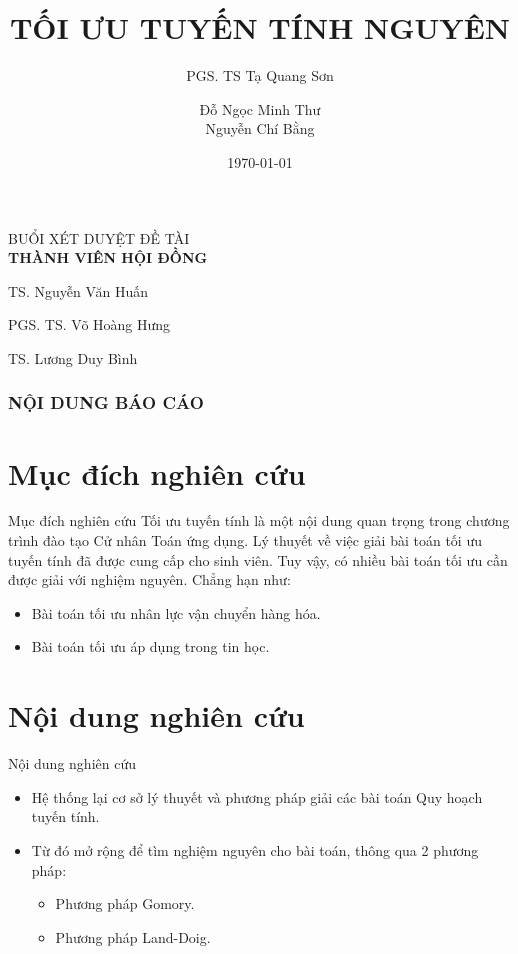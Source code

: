 \documentclass{beamer}
\title{TỐI ƯU TUYẾN TÍNH NGUYÊN}
\subtitle{PGS. TS Tạ Quang Sơn}
\author{Đỗ Ngọc Minh Thư \\ Nguyễn Chí Bằng}
\institute{Khoa Toán Ứng dụng \\ Trường Đại học Sài Gòn}
\date{\today}
\begin{document}
\begin{frame}
\titlepage
\end{frame}

\begin{frame}
\begin{center}
{\huge BUỔI XÉT DUYỆT ĐỀ TÀI}
\\[2\baselineskip]
\textbf{THÀNH VIÊN HỘI ĐỒNG}

TS. Nguyễn Văn Huấn

PGS. TS. Võ Hoàng Hưng

TS. Lương Duy Bình
\end{center}
\end{frame}


\begin{frame}
    \frametitle{NỘI DUNG BÁO CÁO}
    \tableofcontents
\end{frame}

\section{Mục đích nghiên cứu}

\begin{frame}{Mục đích nghiên cứu}
    Tối ưu tuyến tính là một nội dung quan trọng trong chương trình đào tạo Cử nhân Toán ứng dụng. Lý thuyết về việc giải bài toán tối ưu tuyến tính đã được cung cấp cho sinh viên. Tuy vậy, có nhiều bài toán tối ưu cần được giải với nghiệm nguyên. Chẳng hạn như:
    \begin{itemize}
    \item Bài toán tối ưu nhân lực vận chuyển hàng hóa.
    \item Bài toán tối ưu áp dụng trong tin học.
    \end{itemize}
\end{frame}

\section{Nội dung nghiên cứu}
\begin{frame}{Nội dung nghiên cứu}
    \begin{itemize}
    \item Hệ thống lại cơ sở lý thuyết và phương pháp giải các bài toán Quy hoạch tuyến tính.
    \item Từ đó mở rộng để tìm nghiệm nguyên cho bài toán, thông qua 2 phương pháp:
    \begin{itemize}
    \item Phương pháp Gomory.
    \item Phương pháp Land-Doig.
    \end{itemize}
    \end{itemize}
\end{frame}
\end{document}
